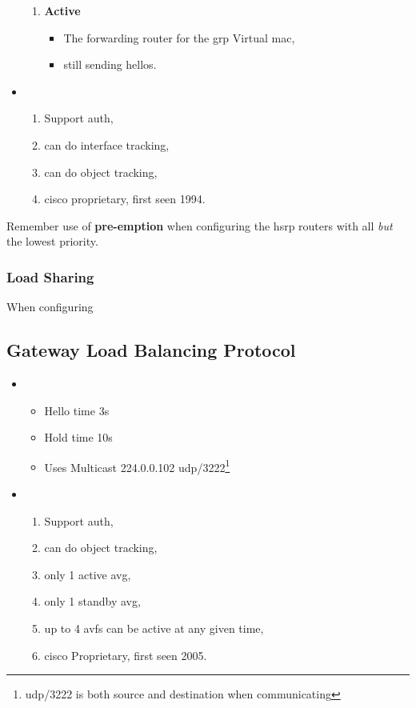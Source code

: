 \begin{itemize}
\begin{enumerate}
        \item \textbf{Active}
        \begin{itemize}
            \item The forwarding router for the grp Virtual \gls{mac},
            \item still sending hellos.
        \end{itemize}
    \end{enumerate}
    \item {}
    \begin{enumerate}
        \item Support auth,
        \item can do interface tracking,
        \item can do object tracking,
        \item cisco proprietary, first seen 1994.
    \end{enumerate}
\end{itemize}

Remember use of \textbf{pre-emption} when configuring the \gls{hsrp} routers with all \textit{but} the lowest priority.

\subsubsection[Blncd]{Load Sharing}

When configuring 

\newpage

\subsection[GLBP]{Gateway Load Balancing Protocol}

\begin{itemize}
    \item {}
    \begin{itemize}
        \item Hello time 3s
        \item Hold time 10s
        \item Uses Multicast 224.0.0.102 udp/3222\footnote{udp/3222 is both source and destination when communicating}
    \end{itemize}
    \item {}
    \begin{enumerate}
        \item Support auth,
        \item can do object tracking,
        \item only 1 active \gls{avg},
        \item only 1 standby \gls{avg},
        \item up to 4 \glspl{avf} can be active at any given time,
        \item cisco Proprietary, first seen 2005.
    \end{enumerate}
\end{itemize}
